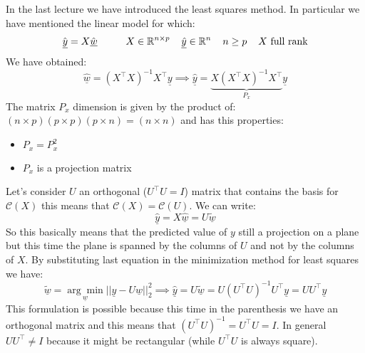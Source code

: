 In the last lecture we have introduced the least squares method. In particular we have mentioned the linear model for which:
\[
    \hat{\underline{y}} = X\hat{\underline{w}} \hspace{1cm} X \in \mathbb{R}^{n \times p} \hspace{0.4cm} \underline{\hat{y}} \in \mathbb{R}^n \hspace{0.4cm} n \geq p \hspace{0.4cm} X \text{ full rank}
\]
We have obtained:
\[
    \underline{\hat{w}} = (X^\intercal X)^{-1} X^\intercal \underline{y} \implies \underline{\hat{y}} = \underbrace{X(X^\intercal X)^{-1} X^\intercal}_{P_x} \underline{y}     
\]
The matrix $P_x$ dimension is given by the product of: $(n\times p)(p\times p)(p \times n) = (n\times n)$ and has this properties:
\begin{itemize}
    \item $P_x = P_x^2$
    \item $P_x$ is a projection matrix
\end{itemize}

Let's consider $U$ an orthogonal ($U^\intercal U = I$) matrix that contains the basis for $\mathcal{C}(X)$ this means that $\mathcal{C}(X) = \mathcal{C}(U)$. We can write:
\[
    \underline{\hat{y}} = X\underline{\hat{w}} = U\underline{\tilde{w}}    
\]
So this basically means that the predicted value of $y$ still a projection on a plane but this time the plane is spanned by the columns of $U$ and not by the columns of $X$. By substituting last equation in the minimization method for least squares we have:
\[
    \underline{\tilde{w}} = \underset{\underline{w}}{\arg\min} ||\underline{y} - U\underline{w}||^2_2 \implies \underline{\hat{y}} = U\underline{\tilde{w}} = U(U^\intercal U)^{-1}U^\intercal \underline{y} = UU^\intercal \underline{y} 
\]
This formulation is possible because this time in the parenthesis we have an orthogonal matrix and this means that $(U^\intercal U)^{-1} = U^\intercal U = I$. In general $UU^\intercal \neq I$ because it might be rectangular (while $U^\intercal U$ is always square).\\


